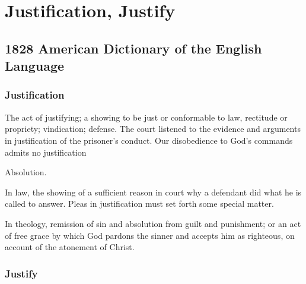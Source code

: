 \section{Justification, Justify}
	\label{JUSTIFICATION}
	

\subsection{1828 American Dictionary of the English Language} %
	\label{JUSTIFICATION-1828}
	
	\subsubsection{Justification}

		\begin{compactitem}
			\item The act of justifying; a showing to be just or conformable to law, rectitude or propriety; vindication; defense. The court listened to the evidence and arguments in justification of the prisoner's conduct. Our disobedience to God's commands admits no justification
			\item Absolution.
			\item In law, the showing of a sufficient reason in court why a defendant did what he is called to answer. Pleas in justification must set forth some special matter.
			\item In theology, remission of sin and absolution from guilt and punishment; or an act of free grace by which God pardons the sinner and accepts him as righteous, on account of the atonement of Christ.
		\end{compactitem}
		
	\subsubsection{Justify}
	
